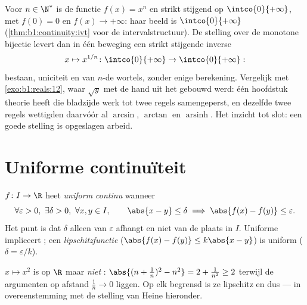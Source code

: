 \begin{example}\label{ex:b1:continuity:nthroot}
Voor $n \in \N^*$ is de functie $f(x) = x^n$  en strikt stijgend
op $\intco{0}{+\infty}$, met $f(0) = 0$ en $f(x) \to +\infty$: haar beeld
is $\intco{0}{+\infty}$ (\cref{thm:b1:continuity:ivt} voor de
intervalstructuur). De stelling over de monotone bijectie levert dan in
één beweging een strikt stijgende \emph{} inverse
\[
x \mapsto x^{1/n} \colon \intco{0}{+\infty} \to
\intco{0}{+\infty} :
\]
bestaan, uniciteit en  van $n$-de wortels, zonder enige
berekening. Vergelijk met \cref{exo:b1:reals:12}, waar $\sqrt y$ met de
hand uit het  gebouwd werd: één hoofdstuk theorie heeft die
bladzijde werk tot twee regels samengeperst, en dezelfde twee regels
wettigden daarvóór al $\arcsin$, $\arctan$ en
$\operatorname{arsinh}$. Het inzicht tot slot: een goede stelling is
opgeslagen arbeid.
\end{example}

\section{Uniforme continuïteit}

\begin{definition}\label{def:b1:continuity:uniform}
$f \colon I \to \R$ heet \emph{uniform continu} wanneer
\[
\forall \varepsilon > 0,\ \exists \delta > 0,\ \forall x, y \in I,
\qquad \abs{x - y} \leq \delta \implies \abs{f(x) - f(y)} \leq
\varepsilon .
\]
Het punt is dat $\delta$ alleen van $\varepsilon$ afhangt en niet van de
plaats in $I$. Uniforme  impliceert ; een
\emph{lipschitzfunctie} ($\abs{f(x) - f(y)} \leq k \abs{x - y}$) is
uniform  ($\delta = \varepsilon/k$).
\end{definition}

\begin{example}\label{ex:b1:continuity:notuniform}
$x \mapsto x^2$ is  op $\R$ maar \emph{niet} :
$\abs{(n + \frac 1n)^2 - n^2} = 2 + \frac{1}{n^2} \geq 2$ terwijl de
argumenten op afstand $\frac 1n \to 0$ liggen. Op elk begrensd 
is ze lipschitz en dus  --- in overeenstemming met de
stelling van Heine hieronder.
\end{example}


